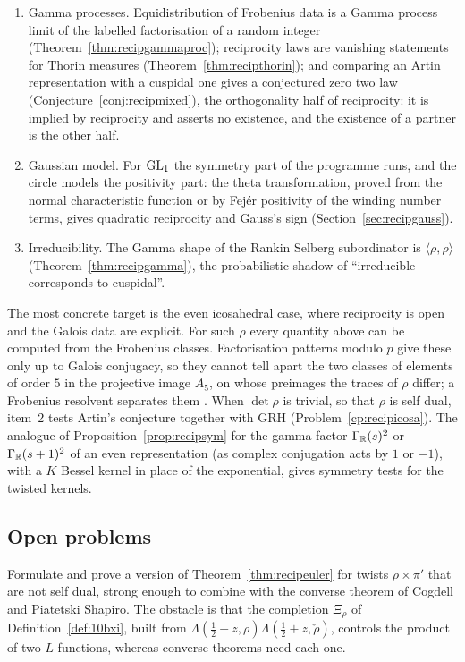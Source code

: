 \begin{enumerate}
\item Gamma processes. Equidistribution of Frobenius data is a Gamma process limit of the labelled factorisation of a random integer (Theorem~\ref{thm:recipgammaproc}); reciprocity laws are vanishing statements for Thorin measures (Theorem~\ref{thm:recipthorin}); and comparing an Artin representation with a cuspidal one gives a conjectured zero two law (Conjecture~\ref{conj:recipmixed}), the orthogonality half of reciprocity: it is implied by reciprocity and asserts no existence, and the existence of a partner is the other half.
\item Gaussian model. For $\mathrm{GL}_1$ the symmetry part of the programme runs, and the circle models the positivity part: the theta transformation, proved from the normal characteristic function or by Fej\'er positivity of the winding number terms, gives quadratic reciprocity and Gauss's sign (Section~\ref{sec:recipgauss}).
\item Irreducibility. The Gamma shape of the Rankin Selberg subordinator is $\langle\rho,\rho\rangle$ (Theorem~\ref{thm:recipgamma}), the probabilistic shadow of ``irreducible corresponds to cuspidal''.
\end{enumerate}

The most concrete target is the even icosahedral case, where reciprocity is open and the Galois data are explicit. For such $\rho$ every quantity above can be computed from the Frobenius classes. Factorisation patterns modulo $p$ give these only up to Galois conjugacy, so they cannot tell apart the two classes of elements of order $5$ in the projective image $A_5$, on whose preimages the traces of $\rho$ differ; a Frobenius resolvent separates them \cite{dokchitser2013}. When $\det\rho$ is trivial, so that $\rho$ is self dual, item~2 tests Artin's conjecture together with GRH (Problem~\ref{cp:recipicosa}). The analogue of Proposition~\ref{prop:recipsym} for the gamma factor $\Gamma_{\mathbb{R}}(s)^2$ or $\Gamma_{\mathbb{R}}(s+1)^2$ of an even representation (as complex conjugation acts by $1$ or $-1$), with a $K$ Bessel kernel in place of the exponential, gives symmetry tests for the twisted kernels.

\subsection{Open problems}

\begin{problem}\label{op:recipgln}
Formulate and prove a version of Theorem~\ref{thm:recipeuler} for twists $\rho\times\pi'$ that are not self dual, strong enough to combine with the converse theorem of Cogdell and Piatetski Shapiro. The obstacle is that the completion $\Xi_\rho$ of Definition~\ref{def:10bxi}, built from $\Lambda(\frac12+z,\rho)\Lambda(\frac12+z,\check\rho)$, controls the product of two $L$ functions, whereas converse theorems need each one.
\end{problem}

